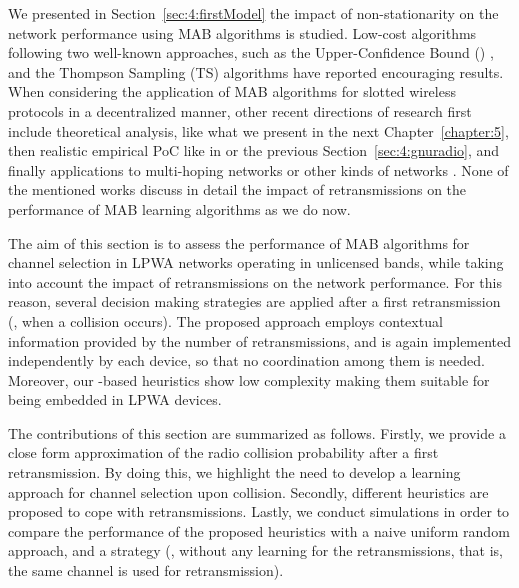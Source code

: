 We presented in Section~\ref{sec:4:firstModel} the impact of non-stationarity on the network performance using MAB algorithms is studied.
Low-cost algorithms following two well-known approaches, such as the Upper-Confidence Bound (\UCB{}) \cite{Auer02,Auer02}, and the Thompson Sampling (TS) algorithms \cite{Thompson33} have reported encouraging results.
When considering the application of MAB algorithms for slotted wireless protocols in a decentralized manner,
other recent directions of research first include theoretical analysis, like what we present in the next Chapter~\ref{chapter:5},
then realistic empirical PoC like in \cite{MoyWSR2014,RobertSDR2014,modiDemo2016,darak2016bayesian,kumar2016two,kumar2017channel} or the previous Section~\ref{sec:4:gnuradio},
and finally applications to multi-hoping networks \cite{Mitton16,Toldov16} or other kinds of networks \cite{Wilhelmi19collaborative,Wilhelmi19potential}.
%
None of the mentioned works discuss in detail the impact of retransmissions on the performance of MAB learning algorithms as we do now.

The aim of this section is to assess the performance of MAB algorithms for channel selection in LPWA networks operating in unlicensed bands, while taking into account the impact of retransmissions on the network performance.
For this reason, several decision making strategies are applied after a first retransmission (\ie, when a collision occurs).
The proposed approach employs contextual information provided by the number of retransmissions, and is again implemented independently by each device, so that no coordination among them is needed.
Moreover, our \UCB{}-based heuristics show low complexity making them suitable for being embedded in LPWA devices.

The contributions of this section are summarized as follows.
	Firstly, we provide a close form approximation of the radio collision probability after a first retransmission.
	By doing this, we highlight the need to develop a learning approach for channel selection upon collision.
%
	Secondly, different heuristics are proposed to cope with retransmissions.
%
	Lastly, we conduct simulations in order to compare the performance of the proposed heuristics with a naive uniform random approach, and a \UCB{} strategy (\ie, without any learning for the retransmissions, that is, the same channel is used for retransmission).


